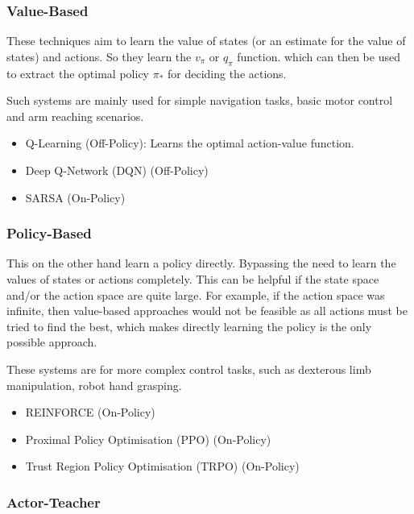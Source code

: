   \subsubsection{Value-Based}
    These techniques aim to learn the value of states (or an estimate for the value of states) and actions. So they learn the $v_\pi$ or $q_\pi$ function. which can then be used to extract the optimal policy $\pi_*$ for deciding the actions.

    Such systems are mainly used for simple navigation tasks, basic motor control and arm reaching scenarios.

    \begin{itemize}
      \item Q-Learning (Off-Policy): Learns the optimal action-value function.
      \item Deep Q-Network (DQN) (Off-Policy)
      \item SARSA (On-Policy)
    \end{itemize}

  \subsubsection{Policy-Based}
  This on the other hand learn a policy directly. Bypassing the need to learn the values of states or actions completely. This can be helpful if the state space and/or the action space are quite large. For example, if the action space was infinite, then value-based approaches would not be feasible as all actions must be tried to find the best, which makes directly learning the policy is the only possible approach.

  These systems are for more complex control tasks, such as dexterous limb manipulation, robot hand grasping.

    \begin{itemize}
      \item REINFORCE (On-Policy)
      \item Proximal Policy Optimisation (PPO) (On-Policy)
      \item Trust Region Policy Optimisation (TRPO) (On-Policy)
    \end{itemize}

  \subsubsection{Actor-Teacher} 
  
